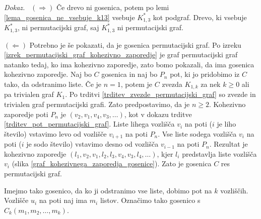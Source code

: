 \documentclass[a4paper, 12pt]{book}
\newenvironment{dokaz}{\emph{Dokaz.}\ }{\hspace{\fill}{$\Box$}}
\begin{document}
\begin{dokaz}
    $(\Rightarrow)$ Če drevo ni gosenica, potem po lemi \ref{lema_gosenica_ne_vsebuje_k13} vsebuje $K_{1,3}^*$ kot podgraf. Drevo, ki vsebuje $K_{1,3}^*$, ni permutacijski graf, saj $K_{1,3}^*$ ni permutacijski graf. 
    
    $(\Leftarrow)$ Potrebno je še pokazati, da je gosenica permutacijski graf. 
    Po izreku \ref{izrek_permutacijski_graf_kohezivno_zaporedje} je graf permutacijski graf natanko tedaj, ko ima kohezivno zaporedje, zato bomo pokazali, da ima gosenica kohezivno zaporedje. Naj bo $C$ gosenica in naj bo $P_n$ pot, ki jo pridobimo iz $C$ tako, da odstranimo liste. Če je $n=1$, potem je $C$ zvezda $K_{1,k}$ za nek $k \geq 0$ ali pa trivialen graf $K_1$. Po trditvi \ref{trditev_zvezde_permutacijski_graf} so zvezde in trivialen graf permutacijski grafi. Zato predpostavimo, da je $n \geq 2$. Kohezivno zaporedje poti $P_n$ je $(v_2, v_1, v_4, v_3, \dots)$, kot v dokazu trditve \ref{trditev_pot_permutacijski_graf}. Liste lihega vozlišča $v_i$ na poti ($i$ je liho število) vstavimo levo od vozlišče $v_{i+1}$ na poti $P_n$. Vse liste sodega vozlišča $v_i$ na poti ($i$ je sodo število) vstavimo desno od vozlišča $v_{i-1}$ na poti $P_n$. Rezultat je kohezivno zaporedje $(l_1, v_2, v_1, l_2, l_3, v_4, v_3, l_4, \dots)$, kjer $l_i$ predstavlja liste vozlišča $v_i$ (slika \ref{graf_kohezivnega_zaporedja_gosenice}). Zato je gosenica $C$ res permutacijski graf.    
\end{dokaz}

Imejmo tako gosenico, da ko ji odstranimo vse liste, dobimo pot na $k$ vozliščih. Vozlišče $u_i$ na poti naj ima $m_i$ listov. Označimo tako gosenico s $C_k(m_1, m_2, \dots, m_k)$.
\end{document}
